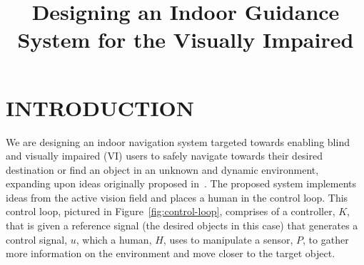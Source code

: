 \documentclass[a4paper, twoside]{article}
\begin{document}
\title{Designing an Indoor Guidance System for the Visually Impaired} 

\author{
}



\onecolumn \maketitle \normalsize \vfill

\section{\uppercase{Introduction}}

\noindent We are designing an indoor navigation system targeted towards enabling blind and visually impaired (VI) users to safely navigate towards their desired destination or find an object in an unknown and dynamic environment, expanding upon ideas originally proposed in~\cite{bellotto2013}. The proposed system implements ideas from the active vision field and places a human in the control loop. This control loop, pictured in Figure~\ref{fig:control-loop}, comprises of a controller, $K$, that is given a reference signal (the desired objects in this case) that generates a control signal, $u$, which a human, $H$, uses to manipulate a sensor, $P$, to gather more information on the environment and move closer to the target object. %
\end{document}

